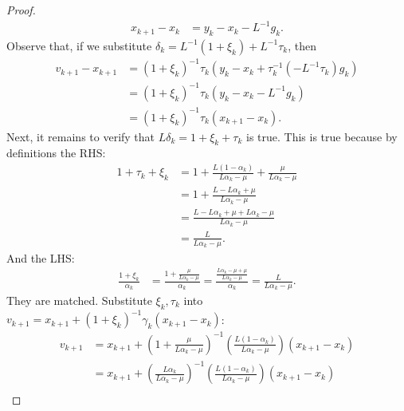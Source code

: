 \documentclass[12pt]{article}
\begin{document}
\begin{proof}
\begin{align*}
            x_{k + 1} - x_k &= y_k - x_k - L^{-1}g_k. 
        \end{align*}
        Observe that, if we substitute $\delta_k = L^{-1}(1 + \xi_k) + L^{-1}\tau_k$, then 
        \begin{align*}
            v_{k + 1} - x_{k + 1} &= (1 + \xi_k)^{-1}\tau_k(y_k - x_k + \tau_k^{-1}(-L^{-1}\tau_k)g_k) 
            \\
            &= 
            (1 + \xi_k)^{-1}\tau_k(y_k - x_k - L^{-1}g_k)
            \\
            &= (1 + \xi_k)^{-1}\tau_k(x_{k + 1} - x_k). 
        \end{align*}
        Next, it remains to verify that $L\delta_k = 1 + \xi_k + \tau_k$ is true. 
        This is true because by definitions the RHS: 
        \begin{align*}
            1 + \tau_k + \xi_k &= 
            1 + \frac{L(1 - \alpha_k)}{L \alpha_k - \mu} 
            + \frac{\mu}{L \alpha_k - \mu}
            \\
            &= 
            1 + \frac{L - L \alpha_k + \mu}{L\alpha_k - \mu}
            \\
            &= 
            \frac{L - L \alpha_k + \mu + L \alpha_k - \mu}{L\alpha_k - \mu}
            \\
            &= \frac{L}{L\alpha_k - \mu}. 
        \end{align*}
        And the LHS: 
        \begin{align*}
            \frac{1 + \xi_k}{\alpha_k}
            &= 
            \frac{1 + \frac{\mu}{L\alpha_k - \mu}}{\alpha_k}
            = 
            \frac{\frac{L\alpha_k - \mu + \mu}{L \alpha_k - \mu}}{\alpha_k}
            = 
            \frac{L}{L\alpha_k - \mu}. 
        \end{align*}
        They are matched. Substitute $\xi_k, \tau_k$ into $v_{k + 1} = x_{k + 1} + (1 + \xi_k)^{-1}\gamma_k(x_{k + 1} - x_k)$: 
        \begin{align*}
            v_{k + 1} &= 
            x_{k + 1} + \left(
                1 + \frac{\mu}{L\alpha_k - \mu}
            \right)^{-1}\left(
                \frac{L(1 - \alpha_k)}{L\alpha_k - \mu}
            \right)(x_{k + 1} - x_k)
            \\
            &= 
            x_{k + 1} + \left(
                \frac{L\alpha_k}{L\alpha_k - \mu}
            \right)^{-1}\left(
                \frac{L(1 - \alpha_k)}{L\alpha_k - \mu}
            \right)(x_{k + 1} - x_k)
            \\

\end{align*}
\end{proof}
\end{document}
